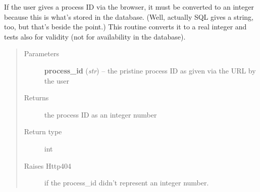 \documentclass[a4paper,11pt,english]{sphinxmanual}
\begin{document}
\begin{fulllineitems}
\label{programming/utilities:samples.utils.views.convert_id_to_int}
If the user gives a process ID via the browser, it must be converted to
an integer because this is what's stored in the database.  (Well, actually
SQL gives a string, too, but that's beside the point.)  This routine
converts it to a real integer and tests also for validity (not for
availability in the database).
\begin{quote}\begin{description}
\item[{Parameters}] \leavevmode
\textbf{process\_id} (\emph{str}) -- the pristine process ID as given via the URL by the user

\item[{Returns}] \leavevmode
the process ID as an integer number

\item[{Return type}] \leavevmode
int

\item[{Raises Http404}] \leavevmode
if the process\_id didn't represent an integer number.

\end{description}\end{quote}

\end{fulllineitems}

\end{document}
